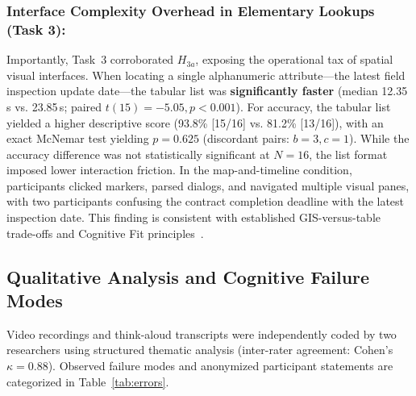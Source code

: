 \documentclass[runningheads]{llncs}
\begin{document}
\subsubsection{Interface Complexity Overhead in Elementary Lookups (Task 3):}
Importantly, Task~3 corroborated $H_{3a}$, exposing the operational tax of spatial visual interfaces. When locating a single alphanumeric attribute---the latest field inspection update date---the tabular list was \textbf{significantly faster} (median 12.35\,s vs. 23.85\,s; paired $t(15) = -5.05, p < 0.001$). For accuracy, the tabular list yielded a higher descriptive score (93.8\% [15/16] vs. 81.2\% [13/16]), with an exact McNemar test yielding $p = 0.625$ (discordant pairs: $b = 3, c = 1$). While the accuracy difference was not statistically significant at $N = 16$, the list format imposed lower interaction friction. In the map-and-timeline condition, participants clicked markers, parsed dialogs, and navigated multiple visual panes, with two participants confusing the contract completion deadline with the latest inspection date. This finding is consistent with established GIS-versus-table trade-offs and Cognitive Fit principles~\cite{duncan2021task,bina2023incorporating}.


\subsection{Qualitative Analysis and Cognitive Failure Modes}
Video recordings and think-aloud transcripts were independently coded by two researchers using structured thematic analysis (inter-rater agreement: Cohen's $\kappa = 0.88$). Observed failure modes and anonymized participant statements are categorized in Table~\ref{tab:errors}.
\end{document}
